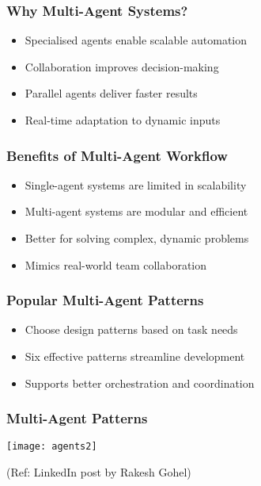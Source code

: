 \begin{frame}[fragile]\frametitle{Why Multi-Agent Systems?}
    \begin{itemize}
        \item Specialised agents enable scalable automation
        \item Collaboration improves decision-making
        \item Parallel agents deliver faster results
        \item Real-time adaptation to dynamic inputs
    \end{itemize}
\end{frame}

\begin{frame}[fragile]\frametitle{Benefits of Multi-Agent Workflow}
    \begin{itemize}
        \item Single-agent systems are limited in scalability
        \item Multi-agent systems are modular and efficient
        \item Better for solving complex, dynamic problems
        \item Mimics real-world team collaboration
    \end{itemize}
\end{frame}

\begin{frame}[fragile]\frametitle{Popular Multi-Agent Patterns}
    \begin{itemize}
        \item Choose design patterns based on task needs
        \item Six effective patterns streamline development
        \item Supports better orchestration and coordination
    \end{itemize}
\end{frame}

\begin{frame}[fragile]\frametitle{Multi-Agent Patterns}
	
	\begin{center}
	\texttt{[image: agents2]}
	\end{center}
	
{\tiny (Ref: LinkedIn post by Rakesh Gohel)}

\end{frame}



